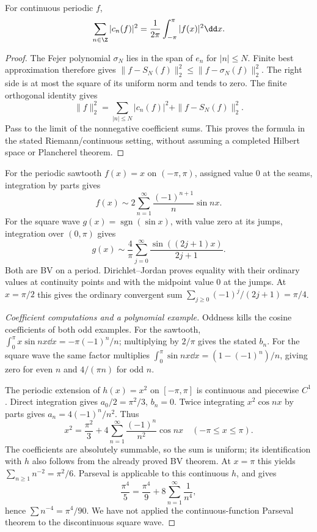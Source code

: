 \begin{theorem}
For continuous periodic $f$,
\[
 \sum_{n\in\Z}|c_n(f)|^2=\frac1{2\pi}\int_{-\pi}^{\pi}|f(x)|^2\dd x.
\]
\end{theorem}
\begin{proof}
The Fejer polynomial $\sigma_N$ lies in the span of $e_n$ for $|n|\leq N$.
Finite best approximation therefore gives
$\|f-S_N(f)\|_2^2\leq\|f-\sigma_N(f)\|_2^2$.
The right side is at most the square of its uniform norm and tends to zero.
The finite orthogonal identity gives
\[
 \|f\|_2^2=\sum_{|n|\leq N}|c_n(f)|^2+\|f-S_N(f)\|_2^2.
\]
Pass to the limit of the nonnegative coefficient sums. This proves the
formula in the stated Riemann/continuous setting, without assuming a
completed Hilbert space or Plancherel theorem.
\end{proof}

\begin{example}
For the periodic sawtooth $f(x)=x$ on $(-\pi,\pi)$, assigned value $0$
at the seams, integration by parts gives
\[
 f(x)\sim2\sum_{n=1}^\infty\frac{(-1)^{n+1}}n\sin nx.
\]
For the square wave $g(x)=\operatorname{sgn}(\sin x)$, with value zero at
its jumps, integration over $(0,\pi)$ gives
\[
 g(x)\sim\frac4\pi\sum_{j=0}^\infty\frac{\sin((2j+1)x)}{2j+1}.
\]
Both are BV on a period. Dirichlet--Jordan proves equality with their
ordinary values at continuity points and with the midpoint value $0$ at
the jumps. At $x=\pi/2$ this gives the ordinary convergent sum
$\sum_{j\geq0}(-1)^j/(2j+1)=\pi/4$.
\end{example}
\begin{proof}[Coefficient computations and a polynomial example]
Oddness kills the cosine coefficients of both odd examples. For the
sawtooth,
$\int_0^\pi x\sin nx\dd x=-\pi(-1)^n/n$; multiplying by $2/\pi$ gives
the stated $b_n$. For the square wave the same factor multiplies
$\int_0^\pi\sin nx\dd x=(1-(-1)^n)/n$, giving zero for even $n$ and
$4/(\pi n)$ for odd $n$.

The periodic extension of $h(x)=x^2$ on $[-\pi,\pi]$ is continuous
and piecewise $C^1$. Direct integration gives $a_0/2=\pi^2/3$, $b_n=0$.
Twice integrating $x^2\cos nx$ by parts gives
$a_n=4(-1)^n/n^2$. Thus
\[
 x^2=\frac{\pi^2}3+4\sum_{n=1}^\infty\frac{(-1)^n}{n^2}\cos nx
 \quad(-\pi\leq x\leq\pi).
\]
The coefficients are absolutely summable, so the sum is uniform; its
identification with $h$ also follows from the already proved BV theorem.
At $x=\pi$ this yields $\sum_{n\geq1}n^{-2}=\pi^2/6$.
Parseval is applicable to this continuous $h$, and gives
\[
 \frac{\pi^4}{5}=\frac{\pi^4}{9}
                 +8\sum_{n=1}^\infty\frac1{n^4},
\]
hence $\sum n^{-4}=\pi^4/90$. We have not applied the
continuous-function Parseval theorem to the discontinuous square wave.
\end{proof}

